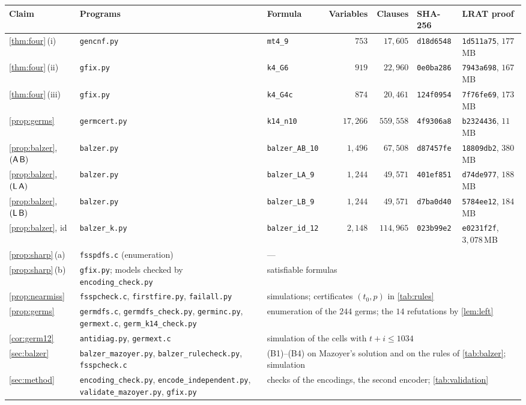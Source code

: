 \begin{tabular}{@{}l>{\raggedright\arraybackslash}p{}lrrll@{}}
\toprule
Claim & Programs & Formula & Variables & Clauses & SHA-256 & LRAT proof\\
\midrule
\ref{thm:four}\,(i) & \texttt{gencnf.py} & \texttt{mt4\_9} & $753$ & $17{,}605$ & \texttt{d18d6548} & \texttt{1d511a75}, $177$\,MB\\
\ref{thm:four}\,(ii) & \texttt{gfix.py} & \texttt{k4\_G6} & $919$ & $22{,}960$ & \texttt{0e0ba286} & \texttt{7943a698}, $167$\,MB\\
\ref{thm:four}\,(iii) & \texttt{gfix.py} & \texttt{k4\_G4c} & $874$ & $20{,}461$ & \texttt{124f0954} & \texttt{7f76fe69}, $173$\,MB\\
\ref{prop:germs} & \texttt{germcert.py} & \texttt{k14\_n10} & $17{,}266$ & $559{,}558$ & \texttt{4f9306a8} & \texttt{b2324436}, $11$\,MB\\
\ref{prop:balzer}, $(\mathsf A\,\mathsf B)$ & \texttt{balzer.py} & \texttt{balzer\_AB\_10} & $1{,}496$ & $67{,}508$ & \texttt{d87457fe} & \texttt{18809db2}, $380$\,MB\\
\ref{prop:balzer}, $(\mathsf L\,\mathsf A)$ & \texttt{balzer.py} & \texttt{balzer\_LA\_9} & $1{,}244$ & $49{,}571$ & \texttt{401ef851} & \texttt{d74de977}, $188$\,MB\\
\ref{prop:balzer}, $(\mathsf L\,\mathsf B)$ & \texttt{balzer.py} & \texttt{balzer\_LB\_9} & $1{,}244$ & $49{,}571$ & \texttt{d7ba0d40} & \texttt{5784ee12}, $184$\,MB\\
\ref{prop:balzer}, id & \texttt{balzer\_k.py} & \texttt{balzer\_id\_12} & $2{,}148$ & $114{,}965$ & \texttt{023b99e2} & \texttt{e0231f2f}, $3{,}078$\,MB\\
\midrule
\ref{prop:sharp}\,(a) & \texttt{fsspdfs.c} (enumeration) & \multicolumn{5}{l}{---}\\
\ref{prop:sharp}\,(b) & \texttt{gfix.py}; models checked by \texttt{encoding\_check.py} & \multicolumn{5}{l}{satisfiable formulas}\\
\ref{prop:nearmiss} & \texttt{fsspcheck.c}, \texttt{firstfire.py}, \texttt{failall.py} & \multicolumn{5}{l}{simulations; certificates $(t_0,p)$ in \cref{tab:rules}}\\
\ref{prop:germs} & \texttt{germdfs.c}, \texttt{germdfs\_check.py}, \texttt{germinc.py}, \texttt{germext.c}, \texttt{germ\_k14\_check.py} & \multicolumn{5}{l}{enumeration of the $244$ germs; the $14$ refutations by \cref{lem:left}}\\
\ref{cor:germ12} & \texttt{antidiag.py}, \texttt{germext.c} & \multicolumn{5}{l}{simulation of the cells with $t+i\le1034$}\\
\ref{sec:balzer} & \texttt{balzer\_mazoyer.py}, \texttt{balzer\_rulecheck.py}, \texttt{fsspcheck.c} & \multicolumn{5}{l}{(B1)--(B4) on Mazoyer's solution and on the rules of \cref{tab:balzer}; simulation}\\
\ref{sec:method} & \texttt{encoding\_check.py}, \texttt{encode\_\allowbreak independent.py}, \texttt{validate\_mazoyer.py}, \texttt{gfix.py} & \multicolumn{5}{l}{checks of the encodings, the second encoder; \cref{tab:validation}}\\
\bottomrule
\end{tabular}

